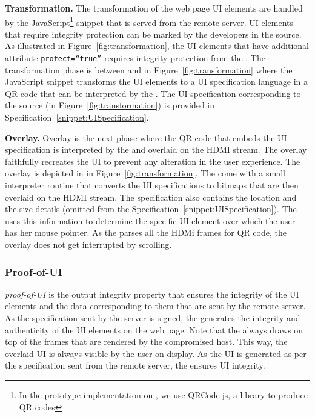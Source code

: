 \begin{mylist}
\item \textbf{Transformation.} The transformation of the web page UI elements are handled by the \name JavaScript\footnote{In the prototype implementation on \name, we use QRCode.js, a \js library to produce QR codes} snippet that is served from the remote server. UI elements that require integrity protection can be marked by the developers in the \html source. As illustrated in Figure~\ref{fig:transformation}, the \html UI elements that have additional attribute \texttt{protect=``true''} requires integrity protection from the \device. The transformation phase is between \one and \two in Figure~\ref{fig:transformation} where the \name JavaScript snippet transforms the UI elements to a UI specification language in a QR code that can be interpreted by the \device. The UI specification corresponding to the \html source (in Figure~\ref{fig:transformation}) is provided in Specification~\ref{snippet:UISpecification}.

\item \textbf{Overlay.} Overlay is the next phase where the QR code that embeds the UI specification is interpreted by the \device and overlaid on the HDMI stream. The overlay faithfully recreates the UI to prevent any alteration in the user experience. The \device overlay is depicted in \three in Figure~\ref{fig:transformation}. The \device come with a small interpreter routine that converts the UI specifications to bitmaps that are then overlaid on the HDMI stream. The specification also contains the location and the size details (omitted from the Specification~\ref{snippet:UISpecification}). The \device uses this information to determine the specific UI element over which the user has her mouse pointer. As the \device parses all the HDMi frames for QR code, the overlay does not get interrupted by scrolling.
\end{mylist}

\subsubsection{Proof-of-UI} \emph{proof-of-UI} is the output integrity property that ensures the integrity of the UI elements and the data corresponding to them that are sent by the remote server. As the specification sent by the server is signed, the \device generates the integrity and authenticity of the UI elements on the web page. Note that the \device always draws on top of the frames that are rendered by the compromised host. This way, the overlaid UI is always visible by the user on display. As the UI is generated as per the specification sent from the remote server, the \device ensures UI integrity.


